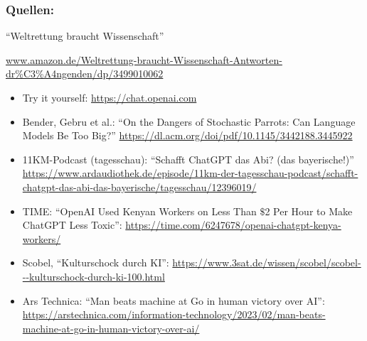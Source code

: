 \documentclass[aspectratio=169,usenames,dvipsnames]{beamer}
\begin{document}
\begin{frame}[fragile]
\frametitle{Quellen:}
\scriptsize
\begin{center}
``Weltrettung braucht Wissenschaft''

\url{www.amazon.de/Weltrettung-braucht-Wissenschaft-Antworten-dr%C3%A4ngenden/dp/3499010062}
\end{center}
\medskip

\begin{itemize}
\item Try it yourself: \url{https://chat.openai.com}
\item Bender, Gebru et al.: ``On the Dangers of Stochastic Parrots: Can Language Models Be Too Big?'' \url{https://dl.acm.org/doi/pdf/10.1145/3442188.3445922}
\item 11KM-Podcast (tagesschau): ``Schafft ChatGPT das Abi? (das bayerische!)'' \url{https://www.ardaudiothek.de/episode/11km-der-tagesschau-podcast/schafft-chatgpt-das-abi-das-bayerische/tagesschau/12396019/}
\item TIME: ``OpenAI Used Kenyan Workers on Less Than $\$$2 Per Hour to Make ChatGPT Less Toxic'': \url{https://time.com/6247678/openai-chatgpt-kenya-workers/}
\item Scobel, ``Kulturschock durch KI'': \url{https://www.3sat.de/wissen/scobel/scobel---kulturschock-durch-ki-100.html}
\item Ars Technica: ``Man beats machine at Go in human victory over AI'': \url{https://arstechnica.com/information-technology/2023/02/man-beats-machine-at-go-in-human-victory-over-ai/}
\end{itemize}
\end{frame}
\end{document}
